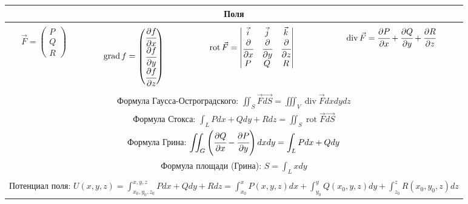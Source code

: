 
\begin{tabular}{c|c|c|c}
	\multicolumn{4}{c}{Поля} \\
	\hline & & &\\
$\displaystyle \vec{F} = \left(\begin{matrix}
P \\ Q \\ R
\end{matrix}\right)$ &

$\displaystyle \operatorname{grad} f = \left(
\begin{matrix}
\cfrac{\partial f}{\partial x} \\ \cfrac{\partial f}{\partial y} \\
\cfrac{\partial f}{\partial z}
\end{matrix}
\right)$

&

$\displaystyle \operatorname{rot} \vec{F} =
\begin{vmatrix}
\vec{i} & \vec{j} & \vec{k} \\
\cfrac{\partial}{\partial x} & \cfrac{\partial}{\partial y} &
\cfrac{\partial}{\partial z} \\
P & Q & R
\end{vmatrix}
$
&
$\displaystyle \operatorname{div}\vec{F} = \cfrac{\partial P}{\partial x} + \cfrac{\partial Q}{\partial y} +
\cfrac{\partial R}{\partial z}$ \\[1.5cm]
\hline
\multicolumn{4}{c}{} \\

\multicolumn{4}{c}{Формула Гаусса-Остроградского: $\displaystyle\iint_S \vec{F}\vec{dS} = \iiint_V \operatorname{div}\vec{F}dxdydz$} \\[0.5cm]


\multicolumn{4}{c}{Формула Стокса: $\displaystyle \int_L Pdx + Qdy + Rdz = \iint_S \operatorname{rot}\vec{F} \vec{dS}$} \\[0.5cm]

\multicolumn{4}{c}{Формула Грина: $\displaystyle \iint_G \left(\cfrac{\partial Q}{\partial x} - \cfrac{\partial P}{\partial y}\right)dxdy = 
	\int_L Pdx+Qdy$} \\[0.5cm]

\multicolumn{4}{c}{Формула площади (Грина): $
	S = \int_L xdy
	$} \\[0.5cm]

\hline 
\multicolumn{4}{c}{} \\
\multicolumn{4}{c}{Потенциал поля: $\displaystyle
	U(x,y,z) = \int_{x_0, y_0, z_0}^{x,y,z} Pdx+Qdy+Rdz =
	\int_{x_0}^{x} P(x,y,z)dx + \int_{y_0}^{y}Q(x_0,y,z)dy +
	\int_{z_0}^{z} R(x_0,y_0,z)dz
	$}\\[0.5cm]


\end{tabular}
